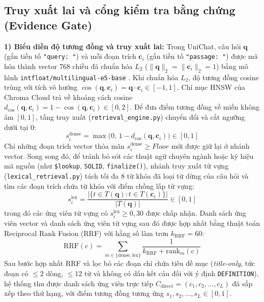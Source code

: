 \documentclass{IEEEtran}
\begin{document}
\subsection{Truy xuất lai và cổng kiểm tra bằng chứng (Evidence Gate)}
\label{subsec:evidence_gate}
\textbf{1) Biểu diễn độ tương đồng và truy xuất lai:}
Trong UniChat, câu hỏi $\mathbf{q}$ (gắn tiền tố \texttt{"query: "}) và mỗi đoạn trích $\mathbf{c}_i$ (gắn tiền tố \texttt{"passage: "}) được mã hóa thành vector 768 chiều đã chuẩn hóa $L_2$ ($\|\mathbf{q}\|_2 = \|\mathbf{c}_i\|_2 = 1$) bằng mô hình \texttt{intfloat/multilingual-e5-base} \cite{wang2024multilinguale5}. Khi chuẩn hóa $L_2$, độ tương đồng cosine trùng với tích vô hướng $\cos(\mathbf{q}, \mathbf{c}_i) = \mathbf{q} \cdot \mathbf{c}_i \in [-1, 1]$. Chỉ mục HNSW \cite{malkov2020hnsw} của Chroma Cloud \cite{chroma_docs} trả về khoảng cách cosine $d_{\cos}(\mathbf{q}, \mathbf{c}_i) = 1 - \cos(\mathbf{q}, \mathbf{c}_i) \in [0, 2]$. Để đưa điểm tương đồng về miền không âm $[0, 1]$, tầng truy xuất (\texttt{retrieval\_engine.py}) chuyển đổi và cắt ngưỡng dưới tại 0:
\begin{equation}
\label{eq:cosine_clip}
s_i^{\text{dense}} = \max\bigl(0,\, 1 - d_{\cos}(\mathbf{q}, \mathbf{c}_i)\bigr) \in [0, 1]
\end{equation}
Chỉ những đoạn trích vector thỏa mãn $s_i^{\text{dense}} \ge \textit{Floor}$ mới được giữ lại ở nhánh vector. Song song đó, để tránh bỏ sót các thuật ngữ chuyên ngành hoặc ký hiệu mã nguồn (như \texttt{\$lookup}, \texttt{SOLID}, \texttt{finalize()}), nhánh truy xuất từ vựng (\texttt{lexical\_retrieval.py}) tách tối đa 8 từ khóa đã loại từ dừng của câu hỏi và tìm các đoạn trích chứa từ khóa với điểm chồng lấp từ vựng:
\begin{equation}
\label{eq:lexical_score}
s_i^{\text{lex}} = \frac{|\{t \in T(\mathbf{q}) : t \in T(\mathbf{c}_i)\}|}{|T(\mathbf{q})|} \in [0, 1]
\end{equation}
trong đó các ứng viên từ vựng có $s_i^{\text{lex}} \ge 0{,}30$ được chấp nhận. Danh sách ứng viên vector và danh sách ứng viên từ vựng sau đó được hợp nhất bằng thuật toán Reciprocal Rank Fusion (RRF) \cite{cormack2009rrf} với hằng số làm trơn $k_{\text{RRF}} = 60$:
\begin{equation}
\label{eq:rrf_score}
\text{RRF}(c) = \sum_{m \in \{\text{dense}, \text{lex}\}} \frac{1}{k_{\text{RRF}} + \text{rank}_m(c)}
\end{equation}
Sau bước hợp nhất RRF và lọc bỏ các đoạn chỉ chứa tiêu đề mục (\textit{title-only}, tức đoạn có $\le 2$ dòng, $\le 12$ từ và không có dấu kết câu đối với ý định \texttt{DEFINITION}), hệ thống thu được danh sách ứng viên trực tiếp $C_{\text{direct}} = (c_1, c_2, \dots, c_L)$ đã sắp xếp theo thứ hạng, với điểm tương đồng tương ứng $s_1, s_2, \dots, s_L \in [0, 1]$.
\end{document}
